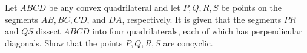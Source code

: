 Let $ABCD$ be any convex quadrilateral and let $P, Q, R, S$ be points on the segments $AB, BC, CD$, and $DA$, respectively. It is given that the segments $PR$ and $QS$ dissect $ABCD$ into four quadrilaterals, each of which has perpendicular diagonals. Show that the points $P, Q, R, S$ are concyclic.
